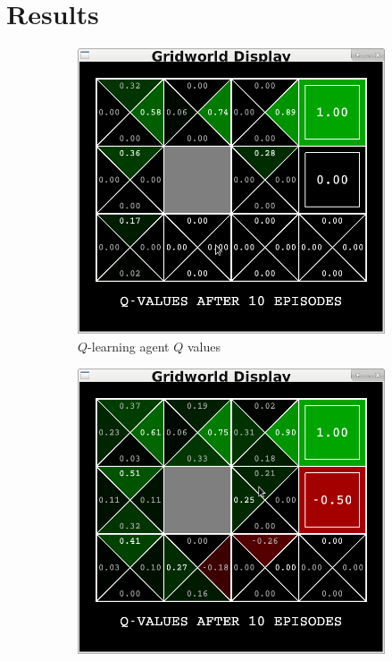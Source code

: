 \documentclass[10pt,conference]{IEEEtran}
\begin{document}
\section{Results}
\label{sec:results}


	\begin{figure}[h]
		\centering
		\begin{subfigure}[b]{0.40\textwidth}
			\includegraphics[width=\textwidth]{./images/qlearning_gridworld_10}
			\caption{\(Q\)-learning agent \(Q\) values}
		\end{subfigure}
		\begin{subfigure}[b]{0.40\textwidth}
			\includegraphics[width=\textwidth]{./images/sarsa_gridworld_10}

\end{subfigure}
\end{figure}
\end{document}
